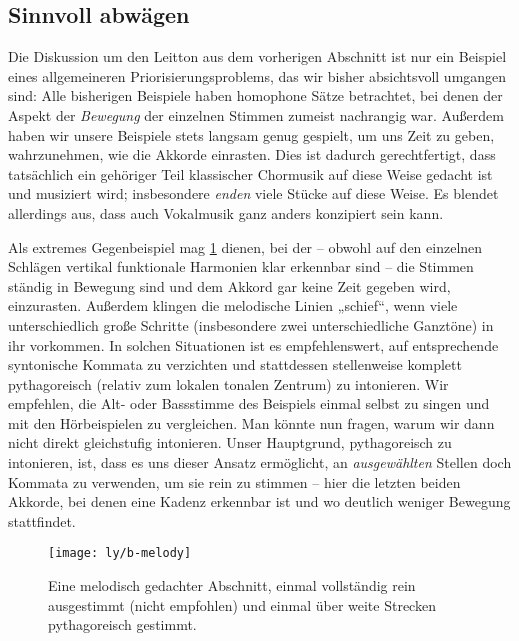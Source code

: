 \subsection{Sinnvoll abwägen}
\label{sec:balance}

Die Diskussion um den Leitton aus dem vorherigen Abschnitt ist nur ein Beispiel
eines allgemeineren Priorisierungsproblems, das wir bisher absichtsvoll umgangen
sind: Alle bisherigen Beispiele haben homophone Sätze betrachtet, bei denen der
Aspekt der \emph{Bewegung} der einzelnen Stimmen zumeist nachrangig
war. Außerdem haben wir unsere Beispiele stets langsam genug gespielt, um uns
Zeit zu geben, wahrzunehmen, wie die Akkorde einrasten. Dies ist dadurch
gerechtfertigt, dass tatsächlich ein gehöriger Teil klassischer Chormusik auf
diese Weise gedacht ist und musiziert wird; insbesondere \emph{enden} viele
Stücke auf diese Weise. Es blendet allerdings aus, dass auch Vokalmusik ganz
anders konzipiert sein kann.

Als extremes Gegenbeispiel mag \cref{fig:melody} dienen, bei der – obwohl auf
den einzelnen Schlägen vertikal funktionale Harmonien klar erkennbar sind – die
Stimmen ständig in Bewegung sind und dem Akkord gar keine Zeit gegeben wird,
einzurasten. Außerdem klingen die melodische Linien „schief“, wenn viele
unterschiedlich große Schritte (insbesondere zwei unterschiedliche Ganztöne) in
ihr vorkommen.  In solchen Situationen ist es empfehlenswert, auf entsprechende
syntonische Kommata zu verzichten und stattdessen stellenweise komplett
pythagoreisch (relativ zum lokalen tonalen Zentrum) zu intonieren.  Wir
empfehlen, die Alt- oder Bassstimme des Beispiels einmal selbst zu singen und
mit den Hörbeispielen zu vergleichen.  Man könnte nun fragen, warum wir dann
nicht direkt gleichstufig intonieren.  Unser Hauptgrund, pythagoreisch zu
intonieren, ist, dass es uns dieser Ansatz ermöglicht, an \emph{ausgewählten}
Stellen doch Kommata zu verwenden, um sie rein zu stimmen – hier die letzten
beiden Akkorde, bei denen eine Kadenz erkennbar ist und wo deutlich weniger
Bewegung stattfindet.

\begin{figure}
  \centering
  \texttt{[image: ly/b-melody]}
  \caption{Eine melodisch gedachter Abschnitt, einmal
    vollständig rein ausgestimmt (nicht empfohlen) und einmal über weite
    Strecken pythagoreisch gestimmt.}\label{fig:melody}
\end{figure}

